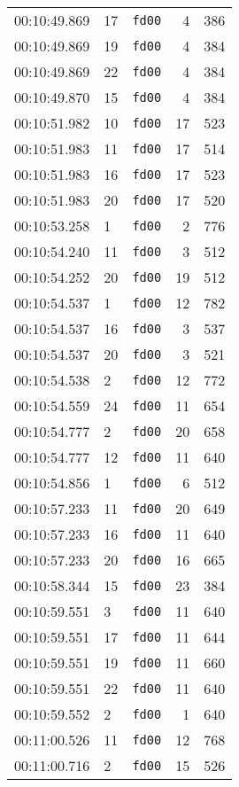 \documentclass{article}
\begin{document}
\begin{longtable}{lllrr}
00:10:49.869 & 17 & \texttt{fd00} & 4 & 386 \\
00:10:49.869 & 19 & \texttt{fd00} & 4 & 384 \\
00:10:49.869 & 22 & \texttt{fd00} & 4 & 384 \\
00:10:49.870 & 15 & \texttt{fd00} & 4 & 384 \\
00:10:51.982 & 10 & \texttt{fd00} & 17 & 523 \\
00:10:51.983 & 11 & \texttt{fd00} & 17 & 514 \\
00:10:51.983 & 16 & \texttt{fd00} & 17 & 523 \\
00:10:51.983 & 20 & \texttt{fd00} & 17 & 520 \\
00:10:53.258 & 1 & \texttt{fd00} & 2 & 776 \\
00:10:54.240 & 11 & \texttt{fd00} & 3 & 512 \\
00:10:54.252 & 20 & \texttt{fd00} & 19 & 512 \\
00:10:54.537 & 1 & \texttt{fd00} & 12 & 782 \\
00:10:54.537 & 16 & \texttt{fd00} & 3 & 537 \\
00:10:54.537 & 20 & \texttt{fd00} & 3 & 521 \\
00:10:54.538 & 2 & \texttt{fd00} & 12 & 772 \\
00:10:54.559 & 24 & \texttt{fd00} & 11 & 654 \\
00:10:54.777 & 2 & \texttt{fd00} & 20 & 658 \\
00:10:54.777 & 12 & \texttt{fd00} & 11 & 640 \\
00:10:54.856 & 1 & \texttt{fd00} & 6 & 512 \\
00:10:57.233 & 11 & \texttt{fd00} & 20 & 649 \\
00:10:57.233 & 16 & \texttt{fd00} & 11 & 640 \\
00:10:57.233 & 20 & \texttt{fd00} & 16 & 665 \\
00:10:58.344 & 15 & \texttt{fd00} & 23 & 384 \\
00:10:59.551 & 3 & \texttt{fd00} & 11 & 640 \\
00:10:59.551 & 17 & \texttt{fd00} & 11 & 644 \\
00:10:59.551 & 19 & \texttt{fd00} & 11 & 660 \\
00:10:59.551 & 22 & \texttt{fd00} & 11 & 640 \\
00:10:59.552 & 2 & \texttt{fd00} & 1 & 640 \\
00:11:00.526 & 11 & \texttt{fd00} & 12 & 768 \\
00:11:00.716 & 2 & \texttt{fd00} & 15 & 526 \\

\end{longtable}
\end{document}
